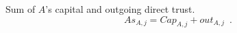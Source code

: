 {}
\begin{definition}[Assets]
  Sum of $A$'s capital and outgoing direct trust.
  \begin{equation}
    As_{A, j} = Cap_{A, j} + out_{A, j} \enspace.
  \end{equation}
\end{definition}
